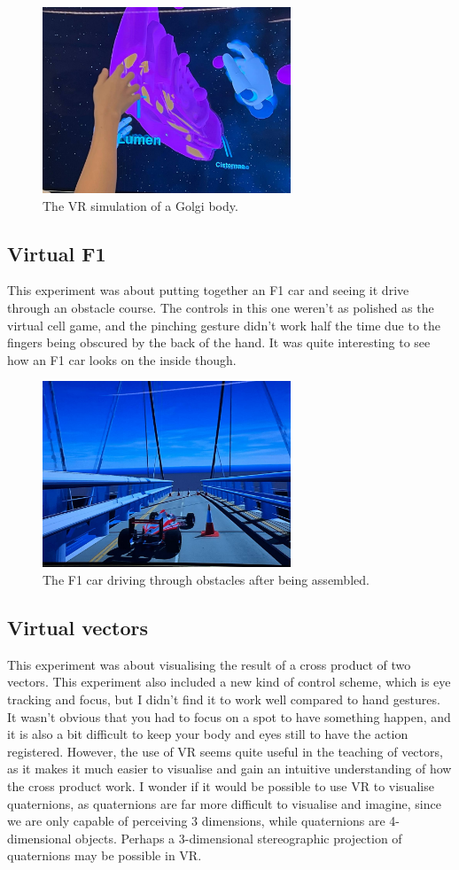 \documentclass[11pt]{article}
\begin{document}
\begin{figure}[htbp]
\centering
\includegraphics[height=15em]{./images/golgi-body.jpg}
\caption{The VR simulation of a Golgi body.}
\end{figure}
\subsection{Virtual F1}
\label{sec:org59769a3}
This experiment was about putting together an F1 car and seeing it drive through an obstacle course. The controls in this one weren't as polished as the virtual cell game, and the pinching gesture didn't work half the time due to the fingers being obscured by the back of the hand. It was quite interesting to see how an F1 car looks on the inside though.

\begin{figure}[htbp]
\centering
\includegraphics[height=15em]{./images/f1-car-driving-through-obstacles.jpg}
\caption{The F1 car driving through obstacles after being assembled.}
\end{figure}
\subsection{Virtual vectors}
\label{sec:org20653eb}
This experiment was about visualising the result of a cross product of two vectors. This experiment also included a new kind of control scheme, which is eye tracking and focus, but I didn't find it to work well compared to hand gestures. It wasn't obvious that you had to focus on a spot to have something happen, and it is also a bit difficult to keep your body and eyes still to have the action registered. However, the use of VR seems quite useful in the teaching of vectors, as it makes it much easier to visualise and gain an intuitive understanding of how the cross product work. I wonder if it would be possible to use VR to visualise quaternions, as quaternions are far more difficult to visualise and imagine, since we are only capable of perceiving 3 dimensions, while quaternions are 4-dimensional objects. Perhaps a 3-dimensional stereographic projection of quaternions may be possible in VR.
\end{document}

